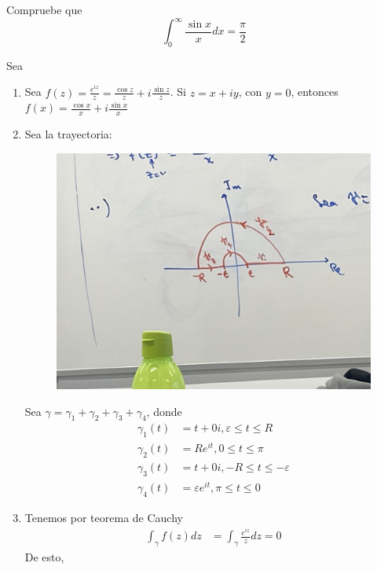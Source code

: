 \begin{ejemplo}
    Compruebe que 
    $$\int_0^{\infty}\frac{\sin x}{x}dx=\frac{\pi}{2}$$
    \begin{sol}
        Sea 
        \begin{enumerate}
            \item Sea $f(z)=\frac{e^{iz}}{z}=\frac{\cos z}{z}+i\frac{\sin z}{z}$. Si $z=x+iy$, con $y=0$, entonces $f(x)=\frac{\cos x}{x}+i\frac{\sin x}{x}$
            \item Sea la trayectoria: 
            \begin{figure}[H]
                \centering
                \includegraphics[scale=0.15]{imagenes/25.3}
            \end{figure}
            Sea $\gamma = \gamma_1+\gamma_2+\gamma_3+\gamma_4$, donde
            \begin{align*}
                \gamma_1(t) &= t+0i,\varepsilon \leq t\leq R\\
                \gamma_2(t) &= Re^{it}, 0\leq t\leq \pi\\
                \gamma_3(t) &= t+0i, -R\leq t\leq -\varepsilon\\
                \gamma_4(t) &= \varepsilon e^{it}, \pi \leq t\leq 0
            \end{align*}
            \item Tenemos por teorema de Cauchy
            \begin{align*}
                \int_\gamma f(z)dz &= \int_\gamma \frac{e^{iz}}{z}dz =0
            \end{align*}
            De esto, 
            \begin{align*}

\end{align*}
\end{enumerate}
\end{sol}
\end{ejemplo}
